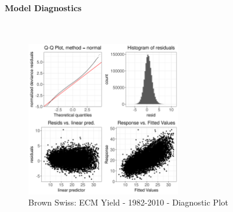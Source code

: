 \paragraph{Model Diagnostics} \quad \\
\begin{figure}[H]
    \centering
    \includegraphics[width=0.6\textwidth]{thesis/figures/models/ecm/before2010/bs_ecm_before2010/bs_ecm_before2010_diagnostics.png}
    \caption[]{Brown Swiss: ECM Yield - 1982-2010 - Diagnostic Plot}
\end{figure}

\newpage
